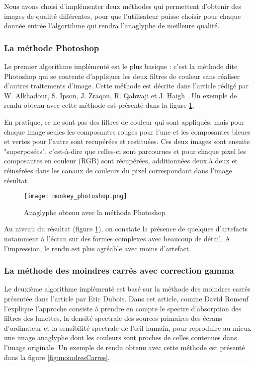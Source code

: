 	Nous avons choisi d'implémenter deux méthodes qui permettent d'obtenir des images de qualité différentes, pour que l'utilisateur puisse choisir pour chaque donnée entrée l'algortihme qui rendra l'anaglyphe de meilleure qualité. %
	  
\subsubsection{La méthode Photoshop}
	Le premier algorithme implémenté est le plus basique : c'est la méthode dite Photoshop qui se contente d'appliquer les deux filtres de couleur sans réaliser d'autres traitements d'image. Cette méthode est décrite dans l'article rédigé par W. Alkhadour, S. Ipson, J. Zraqou, R. Qahwaji et J. Haigh \cite{steteroAnaglyph}. Un exemple de rendu obtenu avec cette méthode est présenté dans la figure \ref{fig:photoshop}.
		
	En pratique, ce ne sont pas des filtres de couleur qui sont appliqués, mais pour chaque image seules les composantes rouges pour l'une et les composantes bleues et vertes pour l'autre sont recupérées et restituées. Ces deux images sont ensuite "superposées", c'est-à-dire que celles-ci sont parcourues et pour chaque pixel les composantes en couleur (RGB) sont récupérées, additionnées deux à deux et réinsérées dans les canaux de couleurs du pixel correspondant dans l'image résultat. %
	
\begin{figure}[h]
	\centering
	\texttt{[image: monkey\_photoshop.png]}
	\caption{\label{fig:photoshop} Anaglyphe obtenu avec la méthode Photoshop \protect}
\end{figure}
		

	Au niveau du résultat (figure \ref{fig:photoshop}), on constate la présence de quelques d'artefacts notamment à l'écran sur des formes complexes avec beaucoup de détail. A l'impression, le rendu est plus agréable avec moins d'artefact. 
\subsubsection{La méthode des moindres carrés avec correction gamma}
	Le deuxième algorithme implémenté est basé sur la méthode des moindres carrés présentée dans l'article \cite{algoDubois} par Eric Dubois. Dans cet article, comme David Romeuf l'explique \cite{explicationAlgoDubois} l'approche consiste à prendre en compte le spectre d'absorption des filtres des lunettes, la densité spectrale des sources primaires des écrans d'ordinateur et la sensibilité spectrale de l'œil humain, pour reproduire au mieux une image anaglyphe dont les couleurs sont proches de celles contenues dans l'image originale. Un exemple de rendu obtenu avec cette méthode est présenté dans la figure \ref{fig:moindresCarres}.
	
